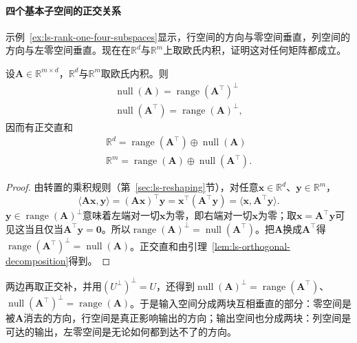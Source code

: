 \paragraph{四个基本子空间的正交关系}
示例~\ref{ex:ls-rank-one-four-subspaces}显示，行空间的方向与零空间垂直，列空间的方向与左零空间垂直。现在在$\mathbb R^d$与$\mathbb R^m$上取欧氏内积，证明这对任何矩阵都成立。
\begin{theorem}[四个基本子空间的正交关系]
\label{thm:ls-four-subspaces-orthogonality}
设$\bm A\in\mathbb R^{m\times d}$，$\mathbb R^d$与$\mathbb R^m$取欧氏内积。则
\begin{equation}
\begin{gathered}
\operatorname{null}(\bm A)=\operatorname{range}(\bm A^\top)^\perp\\
\operatorname{null}(\bm A^\top)=\operatorname{range}(\bm A)^\perp,
\end{gathered}
\label{eq:ls-four-subspaces-orthogonality}
\end{equation}
因而有正交直和
\begin{equation}
\begin{gathered}
\mathbb R^d=\operatorname{range}(\bm A^\top)\oplus\operatorname{null}(\bm A)\\
\mathbb R^m=\operatorname{range}(\bm A)\oplus\operatorname{null}(\bm A^\top).
\end{gathered}
\label{eq:ls-four-subspaces-decomposition}
\end{equation}
\end{theorem}
\begin{proof}
由转置的乘积规则（第~\ref{sec:ls-reshaping}节），对任意$\bm x\in\mathbb R^d$、$\bm y\in\mathbb R^m$，
\[
 \langle\bm A\bm x,\bm y\rangle=(\bm A\bm x)^\top\bm y=\bm x^\top(\bm A^\top\bm y)=\langle\bm x,\bm A^\top\bm y\rangle.
\]
$\bm y\in\operatorname{range}(\bm A)^\perp$意味着左端对一切$\bm x$为零，即右端对一切$\bm x$为零；取$\bm x=\bm A^\top\bm y$可见这当且仅当$\bm A^\top\bm y=\bm0$。所以$\operatorname{range}(\bm A)^\perp=\operatorname{null}(\bm A^\top)$。把$\bm A$换成$\bm A^\top$得$\operatorname{range}(\bm A^\top)^\perp=\operatorname{null}(\bm A)$。正交直和由引理~\ref{lem:ls-orthogonal-decomposition}得到。
\end{proof}
两边再取正交补，并用$(U^\perp)^\perp=U$，还得到$\operatorname{null}(\bm A)^\perp=\operatorname{range}(\bm A^\top)$、$\operatorname{null}(\bm A^\top)^\perp=\operatorname{range}(\bm A)$。于是输入空间分成两块互相垂直的部分：零空间是被$\bm A$消去的方向，行空间是真正影响输出的方向；输出空间也分成两块：列空间是可达的输出，左零空间是无论如何都到达不了的方向。

